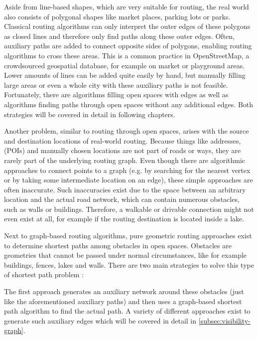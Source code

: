 	Aside from line-based shapes, which are very suitable for routing, the real world also consists of polygonal shapes like market places, parking lots or parks.
	Classical routing algorithms can only interpret the outer edges of these polygons as closed lines and therefore only find paths along these outer edges.
	Often, auxiliary paths are added to connect opposite sides of polygons, enabling routing algorithms to cross these areas.
	This is a common practice in OpenStreetMap, a crowdsourced geospatial database, for example on market or playground areas.
	Lower amounts of lines can be added quite easily by hand, but manually filling large areas or even a whole city with these auxiliary paths is not feasible.
	Fortunately, there are algorithms filling open spaces with edges as well as algorithms finding paths through open spaces without any additional edges.
	Both strategies will be covered in detail in following chapters.
	
	Another problem, similar to routing through open spaces, arises with the source and destination locations of real-world routing.
	Because things like addresses,  (POIs) and manually chosen locations are not part of roads or ways, they are rarely part of the underlying routing graph.
	Even though there are algorithmic approaches to connect points to a graph (e.g. by searching for the nearest vertex or by taking some intermediate location on an edge), these simple approaches are often inaccurate.
	Such inaccuracies exist due to the space between an arbitrary location and the actual road network, which can contain numerous obstacles, such as walls or buildings.
	Therefore, a walkable or drivable connection might not even exist at all, for example if the routing destination is located inside a lake.
	
	Next to graph-based routing algorithms, pure geometric routing approaches exist to determine shortest paths among obstacles in open spaces.
	Obstacles are geometries that cannot be passed under normal circumstances, like for example buildings, fences, lakes and walls.
	There are two main strategies to solve this type of shortest path problem \cite{hershberger-suri}:
	
	The first approach generates an auxiliary network around these obstacles (just like the aforementioned auxiliary paths) and then uses a graph-based shortest path algorithm to find the actual path.
	A variety of different approaches exist to generate such auxiliary edges\cite{graser-osm-open-spaces} which will be covered in detail in \cref{subsec:visibility-graph}.
	
